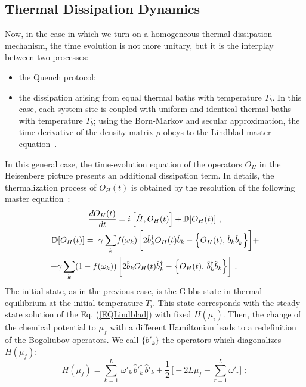 \documentclass[pra,twocolumn,preprintnumbers,amsmath,amssymb,nofootinbib,floatfix,longbibliography]{revtex4}
\begin{document}
\subsection{Thermal Dissipation Dynamics}

Now, in the case in which we turn on a homogeneous thermal
dissipation mechanism, the time evolution is not more
unitary, but it is the interplay between two processes:
\begin{itemize}
  \item the Quench protocol;
  \item the dissipation arising from equal thermal baths
  with temperature $T_b$.
  In this case, each system site is coupled with uniform
  and identical thermal baths with temperature $T_b$; using
  the Born-Markov and secular approximation, the time
  derivative of the density matrix $\rho$ obeys to the
  Lindblad master equation~\cite{BP07}.
\end{itemize}
In this general case, the time-evolution equation of the
operators $O_H$ in the Heisenberg picture presents an
additional dissipation term. In details, the thermalization
process of $O_H(t)$ is obtained by the resolution of the
following master equation~\cite{PCD22, DR21}:
\begin{align}
   \label{EQLindblad}
   \frac{d O_{H}(t) }{d t}  &= i\,\Bigr[\hat H,
      O_{H}(t) \Bigr] + \mathbb{D}[O_{H}(t)]\,\,,\\
  \mathbb{D}[O_H(t)] =
  \,\,\gamma \sum _k &
  f(\omega_k)\,\biggr[2\hat b_{k}^\dagger O_H(t)\hat b_{k}-
  \Bigl\{ O_H(t), \, \hat b_{k} \hat b_{k}^\dagger \Bigl\}
  \biggr]  + \notag\\
  +\gamma \sum_k  (1-f(\omega_k)) &
  \,\biggr[ 2\hat b_{k} O_H(t) \hat b_{k}^\dagger - \Bigl\{
  O_H(t), \, \hat b_{k}^\dagger \hat b_{k} \Bigl\} \biggr]
  \,\,.
\end{align}
The initial state, as in the previous case, is the Gibbs
state in thermal equilibrium at the initial temperature
$T_i$. This state corresponds with the steady state
solution of the Eq. (\ref{EQLindblad}) with fixed
$H(\mu_i)$. Then, the change of the chemical potential to
$\mu_f$ with a different Hamiltonian leads to a
redefinition of the Bogoliubov operators. We call
$\{b'_k\}$ the operators which diagonalizes $H(\mu_f)$:
\begin{equation}
  \label{quenchHdiag}
  H(\mu_f)=\sum _{k=1}^L\,\omega'_k \,\hat b'^\dagger _k\,
  \hat b'_k+ \frac{1}{2}\,\Bigr[ -2L\mu_f - \sum _{r=1}^L
  \omega'_r \Bigr] \,\,;
\end{equation}
\end{document}
